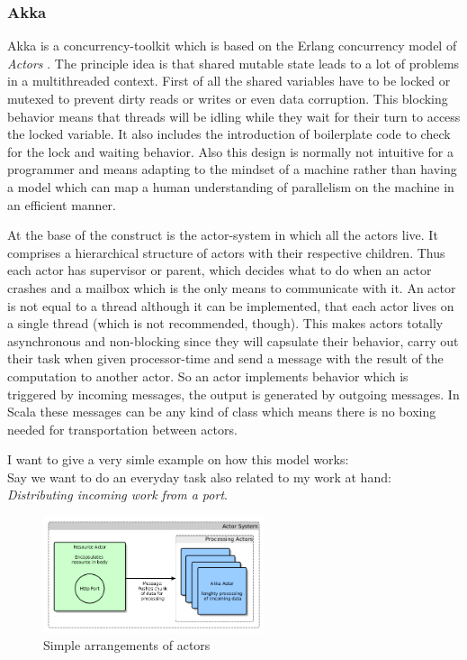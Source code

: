 \documentclass[11p]{scrartcl}
\begin{document}
\subsubsection{Akka}
\label{sec:akka}
Akka \citep{link:akkaHome} is a concurrency-toolkit which is based on the Erlang concurrency model of \textit{Actors} \cite{link:erlangConcurrency}.
The principle idea is that shared mutable state leads to a lot of problems in a multithreaded context. First of all the shared variables have to be locked or mutexed to prevent dirty reads or writes or even data corruption. This blocking behavior means that threads will be idling while they wait for their turn to access the locked variable. It also includes the introduction of boilerplate code to check for the lock and waiting behavior. Also this design is normally not intuitive for a programmer and means adapting to the mindset of a machine rather than having a model which can map a human understanding of parallelism on the machine in an efficient manner.

At the base of the construct is the actor-system in which all the actors live. It comprises a hierarchical structure of actors with their respective children. Thus each actor has supervisor or parent, which decides what to do when an actor crashes and a mailbox which is the only means to communicate with it. An actor is not equal to a thread although it can be implemented, that each actor lives on a single thread (which is not recommended, though).
This makes actors totally asynchronous and non-blocking since they will capsulate their behavior, carry out their task when given processor-time and send a message with the result of the computation to another actor. So an actor implements behavior which is triggered by incoming messages, the output is generated by outgoing messages. In Scala these messages can be any kind of class which means there is no boxing needed for transportation between actors.

I want to give a very simle example on how this model works:\\
Say we want to do an everyday task also related to my work at hand: \textit{Distributing incoming work from a port}.

\begin{figure}
	\begin{center}
		\includegraphics[width=0.58\textwidth]{figures/akkaExample1.png}
	\caption{Simple arrangements of actors}
	\label{fig:akkaExample1}
	\end{center}		
 	
\end{figure}
\end{document}
